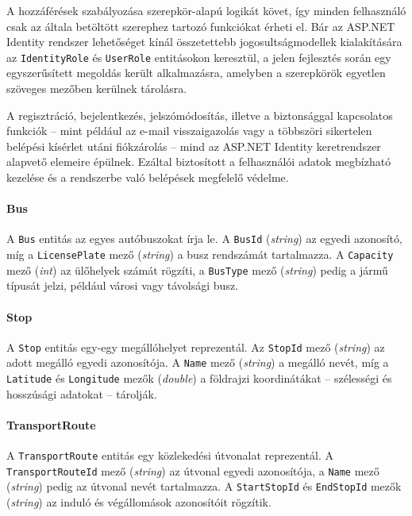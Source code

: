 A hozzáférések szabályozása szerepkör-alapú logikát követ, így minden felhasználó csak az általa betöltött szerephez tartozó funkciókat érheti el. Bár az ASP.NET Identity rendszer lehetőséget kínál összetettebb jogosultságmodellek kialakítására az \texttt{IdentityRole} és \texttt{UserRole} entitásokon keresztül, a jelen fejlesztés során egy egyszerűsített megoldás került alkalmazásra, amelyben a szerepkörök egyetlen szöveges mezőben kerülnek tárolásra.

A regisztráció, bejelentkezés, jelszómódosítás, illetve a biztonsággal kapcsolatos funkciók – mint például az e-mail visszaigazolás vagy a többszöri sikertelen belépési kísérlet utáni fiókzárolás – mind az ASP.NET Identity keretrendszer alapvető elemeire épülnek. Ezáltal biztosított a felhasználói adatok megbízható kezelése és a rendszerbe való belépések megfelelő védelme.


\paragraph{Bus}

A \texttt{Bus} entitás az egyes autóbuszokat írja le. A \texttt{BusId} (\textit{string}) az egyedi azonosító, míg a \texttt{LicensePlate} mező (\textit{string}) a busz rendszámát tartalmazza. A \texttt{Capacity} mező (\textit{int}) az ülőhelyek számát rögzíti, a \texttt{BusType} mező (\textit{string}) pedig a jármű típusát jelzi, például városi vagy távolsági busz.

\paragraph{Stop}

A \texttt{Stop} entitás egy-egy megállóhelyet reprezentál. Az \texttt{StopId} mező (\textit{string}) az adott megálló egyedi azonosítója. A \texttt{Name} mező (\textit{string}) a megálló nevét, míg a \texttt{Latitude} és \texttt{Longitude} mezők (\textit{double}) a földrajzi koordinátákat – szélességi és hosszúsági adatokat – tárolják.

\paragraph{TransportRoute}

A \texttt{TransportRoute} entitás egy közlekedési útvonalat reprezentál. A \texttt{TransportRouteId} mező (\textit{string}) az útvonal egyedi azonosítója, a \texttt{Name} mező (\textit{string}) pedig az útvonal nevét tartalmazza. A \texttt{StartStopId} és \texttt{EndStopId} mezők (\textit{string}) az induló és végállomások azonosítóit rögzítik.

